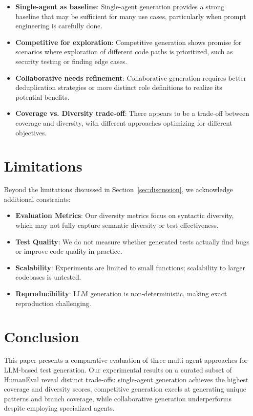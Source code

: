 \documentclass[11pt]{article}
\begin{document}
\begin{itemize}
\item \textbf{Single-agent as baseline}: Single-agent generation provides a strong baseline that may be sufficient for many use cases, particularly when prompt engineering is carefully done.
\item \textbf{Competitive for exploration}: Competitive generation shows promise for scenarios where exploration of different code paths is prioritized, such as security testing or finding edge cases.
\item \textbf{Collaborative needs refinement}: Collaborative generation requires better deduplication strategies or more distinct role definitions to realize its potential benefits.
\item \textbf{Coverage vs. Diversity trade-off}: There appears to be a trade-off between coverage and diversity, with different approaches optimizing for different objectives.
\end{itemize}

\section{Limitations}

Beyond the limitations discussed in Section~\ref{sec:discussion}, we acknowledge additional constraints:

\begin{itemize}
\item \textbf{Evaluation Metrics}: Our diversity metrics focus on syntactic diversity, which may not fully capture semantic diversity or test effectiveness.
\item \textbf{Test Quality}: We do not measure whether generated tests actually find bugs or improve code quality in practice.
\item \textbf{Scalability}: Experiments are limited to small functions; scalability to larger codebases is untested.
\item \textbf{Reproducibility}: LLM generation is non-deterministic, making exact reproduction challenging.
\end{itemize}

\section{Conclusion}

This paper presents a comparative evaluation of three multi-agent approaches for LLM-based test generation. Our experimental results on a curated subset of HumanEval reveal distinct trade-offs: single-agent generation achieves the highest coverage and diversity scores, competitive generation excels at generating unique patterns and branch coverage, while collaborative generation underperforms despite employing specialized agents.
\end{document}
